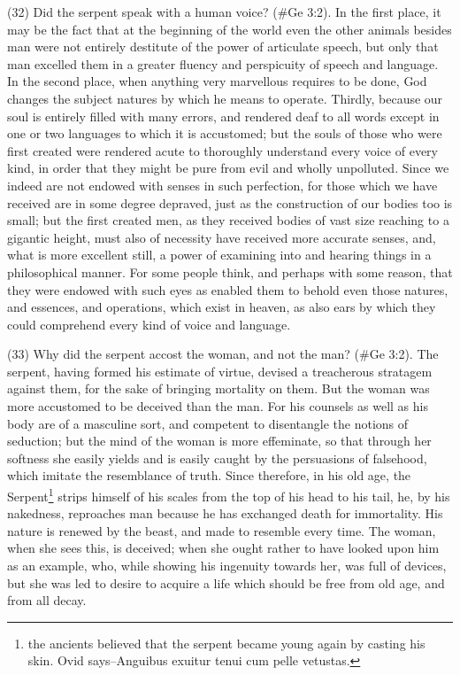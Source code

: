 (32) Did the serpent speak with a human voice? (\#Ge 3:2). In the first place, it may be the fact
that at the beginning of the world even the other animals besides man were not entirely destitute of
the power of articulate speech, but only that man excelled them in a greater fluency and perspicuity
of speech and language. In the second place, when anything very marvellous requires to be done,
God changes the subject natures by which he means to operate. Thirdly, because our soul is
entirely filled with many errors, and rendered deaf to all words except in one or two languages to
which it is accustomed; but the souls of those who were first created were rendered acute to
thoroughly understand every voice of every kind, in order that they might be pure from evil and
wholly unpolluted. Since we indeed are not endowed with senses in such perfection, for those
which we have received are in some degree depraved, just as the construction of our bodies too is
small; but the first created men, as they received bodies of vast size reaching to a gigantic height,
must also of necessity have received more accurate senses, and, what is more excellent still, a
power of examining into and hearing things in a philosophical manner. For some people think, and
perhaps with some reason, that they were endowed with such eyes as enabled them to behold
even those natures, and essences, and operations, which exist in heaven, as also ears by which
they could comprehend every kind of voice and language.

(33) Why did the serpent accost the woman, and not the man? (\#Ge 3:2). The serpent, having
formed his estimate of virtue, devised a treacherous stratagem against them, for the sake of
bringing mortality on them. But the woman was more accustomed to be deceived than the man. For
his counsels as well as his body are of a masculine sort, and competent to disentangle the notions
of seduction; but the mind of the woman is more effeminate, so that through her softness she
easily yields and is easily caught by the persuasions of falsehood, which imitate the resemblance
of truth. Since therefore, in his old age, the Serpent\footnote{the ancients believed that the serpent became young
again by casting his skin. Ovid says--Anguibus exuitur tenui cum pelle vetustas.} strips himself of his scales from
the top of his head to his tail, he, by his nakedness, reproaches man because he has exchanged
death for immortality. His nature is renewed by the beast, and made to resemble every time. The
woman, when she sees this, is deceived; when she ought rather to have looked upon him as an
example, who, while showing his ingenuity towards her, was full of devices, but she was led to
desire to acquire a life which should be free from old age, and from all decay.

